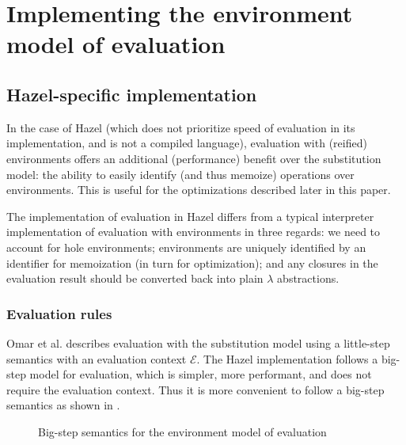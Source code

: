 \section{Implementing the environment model of evaluation}
\label{sec:env_model_evaluation}

\subsection{Hazel-specific implementation}
\label{sec:eval_with_envs}

In the case of Hazel (which does not prioritize speed of evaluation in its implementation, and is not a compiled language), evaluation with (reified) environments offers an additional (performance) benefit over the substitution model: the ability to easily identify (and thus memoize) operations over environments. This is useful for the optimizations described later in this paper.

The implementation of evaluation in Hazel differs from a typical interpreter implementation of evaluation with environments in three regards: we need to account for hole environments; environments are uniquely identified by an identifier for memoization (in turn for optimization); and any closures in the evaluation result should be converted back into plain $\lambda$ abstractions.

\subsubsection{Evaluation rules}
\label{sec:evalenv-rules}


Omar et al. \cite{conf/popl/HazelnutLive19} describes evaluation with the substitution model using a little-step semantics with an evaluation context $\mathcal{E}$. The Hazel implementation follows a big-step model for evaluation, which is simpler, more performant, and does not require the evaluation context. Thus it is more convenient to follow a big-step semantics as shown in .

\begin{figure}
  \centering
  \begin{mdframed}
    \begin{singlespace}
      
    \end{singlespace}
  \end{mdframed}
  \caption{Big-step semantics for the environment model of evaluation}
  \label{fig:big-step-formal}
\end{figure}

